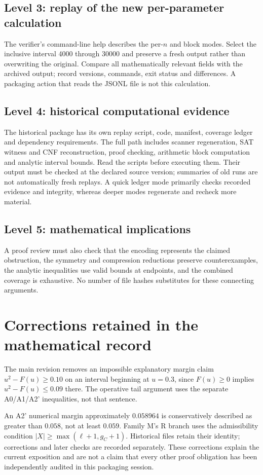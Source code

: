 \documentclass[11pt,letterpaper]{article}
\theoremstyle{remark}\newtheorem{remark}[theorem]{Remark}
\begin{document}
\subsection*{Level 3: replay of the new per-parameter calculation}
The verifier's command-line help describes the per-$n$ and block modes. Select the inclusive interval 4000 through 30000 and preserve a fresh output rather than overwriting the original. Compare all mathematically relevant fields with the archived output; record versions, commands, exit status and differences. A packaging action that reads the JSONL file is not this calculation.

\subsection*{Level 4: historical computational evidence}
The historical package has its own replay script, code, manifest, coverage ledger and dependency requirements. The full path includes scanner regeneration, SAT witness and CNF reconstruction, proof checking, arithmetic block computation and analytic interval bounds. Read the scripts before executing them. Their output must be checked at the declared source version; summaries of old runs are not automatically fresh replays. A quick ledger mode primarily checks recorded evidence and integrity, whereas deeper modes regenerate and recheck more material.

\subsection*{Level 5: mathematical implications}
A proof review must also check that the encoding represents the claimed obstruction, the symmetry and compression reductions preserve counterexamples, the analytic inequalities use valid bounds at endpoints, and the combined coverage is exhaustive. No number of file hashes substitutes for these connecting arguments.

\section{Corrections retained in the mathematical record}
The main revision removes an impossible explanatory margin claim $u^2-F(u)\ge0.10$ on an interval beginning at $u=0.3$, since $F(u)\ge0$ implies $u^2-F(u)\le0.09$ there. The operative tail argument uses the separate A0/A1/A2' inequalities, not that sentence.

An A2' numerical margin approximately $0.058964$ is conservatively described as greater than $0.058$, not at least $0.059$. Family M's R branch uses the admissibility condition $|X|\ge\max(\ell+1,g_C+1)$. Historical files retain their identity; corrections and later checks are recorded separately. These corrections explain the current exposition and are not a claim that every other proof obligation has been independently audited in this packaging session.
\end{document}
